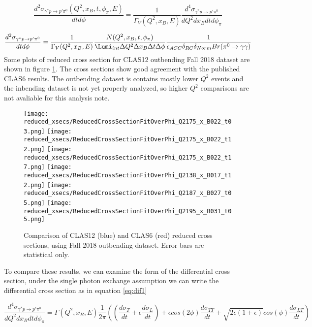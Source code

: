  \begin{equation}\label{xsec_red}
    \frac{d^2\sigma_{\gamma^*p \rightarrow p'\pi^0}(Q^2,x_B,t,\phi_{\pi},E)}{dtd\phi} = \frac{1}{\Gamma_V(Q^2,x_B,E)} \frac{d^4\sigma_{\gamma^*p \rightarrow p'\pi^0}}{dQ^2dx_Bdtd\phi_{\pi}}
\end{equation}


 \begin{equation}\label{xsec_red_full}
    \frac{d^2\sigma_{\gamma^*p \rightarrow p'\pi^0}}{dtd\phi} = \frac{1}{\Gamma_V(Q^2,x_B,E)} \frac{N(Q^2,x_B,t,\phi_{\pi})}{\Lumi_{int}\Delta Q^2\Delta x_B\Delta t\Delta \phi} \frac{1}{\epsilon_{ACC} \delta_{RC} \delta_{Norm} Br(\pi^0 \rightarrow \gamma \gamma)}
\end{equation}
Some plots of reduced cross section for CLAS12 outbending Fall 2018 dataset are shown in figure \ref{fig:reduced_xsec_plots}. The cross sections show good agreement with the published CLAS6 results. The outbending dataset is contains mostly lower $Q^2$ events and the inbending dataset is not yet properly analyzed, so higher $Q^2$ comparisons are not avaliable for this analysis note. 


\begin{figure}[hbt]
	\centering
	\texttt{[image: reduced\_xsecs/ReducedCrossSectionFitOverPhi\_Q2175\_x\_B022\_t03.png]}
	\texttt{[image: reduced\_xsecs/ReducedCrossSectionFitOverPhi\_Q2175\_x\_B022\_t12.png]}
	\texttt{[image: reduced\_xsecs/ReducedCrossSectionFitOverPhi\_Q2175\_x\_B022\_t17.png]}
	\texttt{[image: reduced\_xsecs/ReducedCrossSectionFitOverPhi\_Q2138\_x\_B017\_t12.png]}
	\texttt{[image: reduced\_xsecs/ReducedCrossSectionFitOverPhi\_Q2187\_x\_B027\_t05.png]}
	\texttt{[image: reduced\_xsecs/ReducedCrossSectionFitOverPhi\_Q2195\_x\_B031\_t05.png]}
	
	\caption{Comparison of CLAS12 (blue) and CLAS6 (red) reduced cross sections, using Fall 2018 outbending dataset. Error bars are statistical only.}
	\label{fig:reduced_xsec_plots}
\end{figure}

To compare these results, we can examine the form of the differential cross section, under the single photon exchange assumption we can write the differential cross section as in equation \ref{eq:dif1}

 \begin{equation}\label{dif1}
     \frac{d^4\sigma_{\gamma^*p \rightarrow p'\pi^0}}{dQ^2dx_Bdtd\phi_{\pi}} =
     \Gamma (Q^2, x_B, E)
     \frac{1}{2\pi}
     ((\frac{d\sigma_T}{dt}+\epsilon\frac{d\sigma_L}{dt})+
     \epsilon cos(2\phi) \frac{d\sigma_{TT}}{dt} + \sqrt{2\epsilon(1+\epsilon)}cos(\phi)\frac{d\sigma_{LT}}{dt})
\end{equation}

